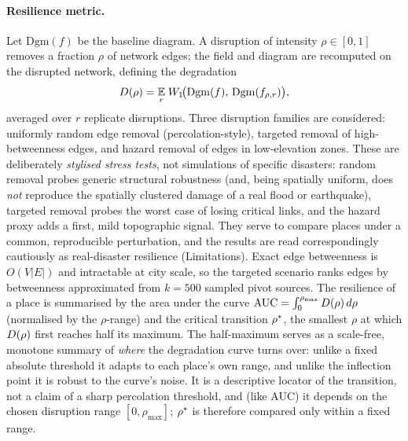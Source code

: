 \paragraph{Resilience metric.} Let $\mathrm{Dgm}(f)$ be the baseline diagram. A
disruption of intensity $\rho\in[0,1]$ removes a fraction $\rho$ of network
edges; the field and diagram are recomputed on the disrupted network, defining the
degradation
\[
D(\rho)=\underset{r}{\mathbb{E}}\;W_1\!\big(\mathrm{Dgm}(f),\,\mathrm{Dgm}(f_{\rho,r})\big),
\]
averaged over $r$ replicate disruptions. Three disruption families are considered:
uniformly random edge removal (percolation-style), targeted removal of
high-betweenness edges, and hazard removal of edges in low-elevation zones. These
are deliberately \emph{stylised stress tests}, not simulations of specific
disasters: random removal probes generic structural robustness (and, being spatially
uniform, does \emph{not} reproduce the spatially clustered damage of a real flood or
earthquake), targeted removal probes the worst case of losing critical links, and
the hazard proxy adds a first, mild topographic signal. They serve to compare
places under a common, reproducible perturbation, and the results are read
correspondingly cautiously as real-disaster resilience (Limitations). Exact
edge betweenness is $O(V\lvert E\rvert)$ and intractable at city scale, so the
targeted scenario ranks edges by betweenness approximated from $k=500$ sampled
pivot sources. The
resilience of a place is summarised by the area under the curve
$\mathrm{AUC}=\int_0^{\rho_{\max}}D(\rho)\,d\rho$ (normalised by the $\rho$-range)
and the critical transition $\rho^{*}$, the smallest $\rho$ at which $D(\rho)$ first
reaches half its maximum. The half-maximum serves as a scale-free, monotone
summary of \emph{where} the degradation curve turns over: unlike a fixed absolute
threshold it adapts to each place's own range, and unlike the inflection point it
is robust to the curve's noise. It is a descriptive locator of the transition, not
a claim of a sharp percolation threshold, and (like AUC) it depends on the chosen
disruption range $[0,\rho_{\max}]$; $\rho^{*}$ is therefore compared only within a
fixed range.

